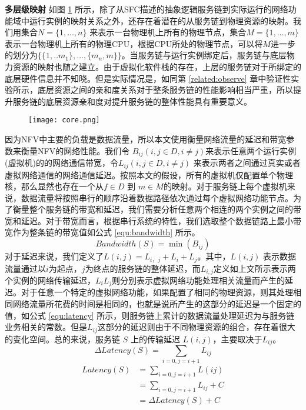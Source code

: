 \textbf{多层级映射}{ }如图 \ref{fig:mapping} 所示，除了从SFC描述的抽象逻辑服务链到实际运行的网络功能域中运行实例的映射关系之外，还存在着潜在的从服务链到物理资源的映射。我们用集合$N = \{1,...,n\}$ 来表示一台物理机上所有的物理节点，集合$M = \{1,...,m\}$表示一台物理机上所有的物理CPU，根据CPU所处的物理节点，可以将$M$进一步的划分为$ \{\{1,..m_{1}\},...,\{m_{n},m\}\}$。当服务链与运行实例绑定后，服务链与底层物力资源的映射也随之建立。由于虚拟化软件栈的存在，上层的服务链对于所绑定的底层硬件信息并不知晓。但是实际情况是，如同第 \ref{related:observe} 章中验证性实验所示，底层资源之间的亲和度关系对于整条服务链的性能影响相当严重，所以提升服务链的底层资源亲和度对提升服务链的整体性能具有重要意义。
\begin{figure}[!htp]
	\label{fig:mapping}
	\centering
	\texttt{[image: core.png]}
\end{figure}

因为NFV中主要的负载是数据流量，所以本文使用衡量网络流量的延迟和带宽参数来衡量NFV的网络性能。我们令 $B_{ij} (i,j \in D, i \neq j)$来表示任意两个运行实例(虚拟机)的的网络通信带宽，令$L_{ij}(i,j \in D ,i \neq j)$ 来表示两者之间通过真实或者虚拟网络通信的网络通信延迟。按照本文的假设，所有的虚拟机仅配置单个物理核，那么显然也存在一个从$f \in D$ 到 $m \in M$的映射。对于服务链上每个虚拟机来说，数据流量将按照串行的顺序沿着数据路径依次通过每个虚拟网络功能节点。为了衡量整个服务链的带宽和延迟，我们需要分析任意两个相连的两个实例之间的带宽和延迟。对于带宽而言，根据串行系统的特性，我们选取整个数据链路上最小带宽作为整条链的带宽值如公式 \ref{equ:bandwidth} 所示。
\begin{equation}
\label{equ:bandwidth}
Bandwidth(S) = \min{(B_{i j } )}  
\end{equation}
对于延迟来说，我们定义了$L(i,j) = L_{i，j} + L_{i} + L_{j}$。其中，$L(i,j)$ 表示数据流量通过以$i$为起点，$j$为终点的服务链的整体延迟，而$L_{i,j}$定义如上文所示表示两个实例的网络传输延迟，$L_{i}$$L_{j}$则分别表示虚拟网络功能处理相关流量而产生的延迟。对于任意一个特定的虚拟网络功能，如果配置了相同的物理资源，则其处理相同网络流量所花费的时间是相同的，也就是说所产生的这部分的延迟是一个固定的值，如公式 \ref{equ:latency} 所示，则服务链上累计的数据流量处理延迟为与服务链业务相关的常数。但是$L_{ij}$这部分的延迟则由于不同物理资源的组合，存在着很大的变化空间。总的来说，服务链 $S$ 上的传输延迟 $L(i,j)$，主要取决于$L_{ij}$。
\begin{equation}
\Delta Latency(S) = \sum_{i=0,j=i+1}{L_{ij}} 
\end{equation}
\begin{equation}
\label{equ:latency}
\begin{aligned}
Latency(S) & = \sum_{i=0,j=i+1}{L(ij)} \\
& = \sum_{i=0,j=i+1}{L_{ij}}  + C \\
& = \Delta Latency(S) + C  		  \\ 
\end{aligned}
\end{equation}

